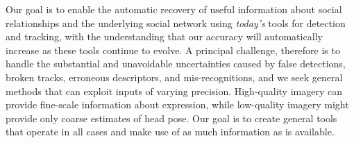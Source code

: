

Our goal is to enable the automatic recovery of useful information about social relationships and the underlying social network using \emph{today's} tools for detection and tracking, with the understanding that our accuracy will automatically increase as these tools continue to evolve. A principal challenge, therefore is to handle the substantial and unavoidable uncertainties caused by false detections, broken tracks, erroneous descriptors, and mis-recognitions, and we seek general methods that can exploit inputs of varying precision. High-quality imagery can provide fine-scale information about expression, while low-quality imagery might provide only coarse estimates of head pose. Our goal is to create general tools that operate in all cases and make use of as much information as is available.



